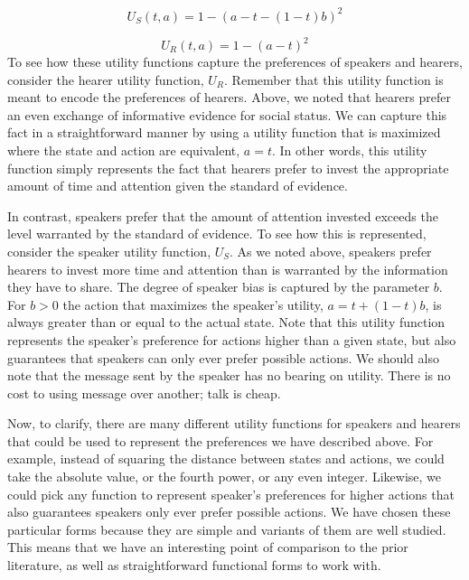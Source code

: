 \documentclass[linguex]{sp}
\theoremstyle{definition} \newtheorem{definition}{Definition}
\begin{document}
 \begin{equation}
      U_S(t, a) = 1 - (a - t - (1-t)b)^2
      \label{U_S}
 \end{equation}
 
 \begin{equation}
      U_R(t, a) = 1 - (a - t)^2
      \label{U_R}
 \end{equation}
To see how these utility functions capture the preferences of speakers and hearers, consider the hearer utility function, $U_R$. Remember that this utility function is meant to encode the preferences of hearers. Above, we noted that hearers prefer an even exchange of informative evidence for social status. We can capture this fact in a straightforward manner by using a utility function that is maximized where the state and action are equivalent, $a = t$. In other words, this utility function simply represents the fact that hearers prefer to invest the appropriate amount of time and attention given the standard of evidence. 

In contrast, speakers prefer that the amount of attention invested exceeds the level warranted by the standard of evidence. To see how this is represented, consider the speaker utility function, $U_S$. As we noted above, speakers prefer hearers to invest more time and attention than is warranted by the information they have to share.  The degree of speaker bias is captured by the parameter $b$. For $b > 0$ the action that maximizes the speaker's utility, $a = t + (1-t)b$, is always greater than or equal to the actual state.  Note that this utility function represents the speaker's preference for actions higher than a given state, but also guarantees that speakers can only ever prefer possible actions. We should also note that the message sent by the speaker has no bearing on utility. There is no cost to using message over another; talk is cheap.

Now, to clarify, there are many different utility functions for speakers and hearers that could be used to represent the preferences we have described above. For example, instead of squaring the distance between states and actions, we could take the absolute value, or the fourth power, or any even integer. Likewise, we could pick any function to represent speaker's preferences for higher actions that also guarantees speakers only ever prefer possible actions. We have chosen these particular forms because they are simple and variants of them are well studied. This means that we have an interesting point of comparison to the prior literature, as well as straightforward functional forms to work with.
\end{document}
